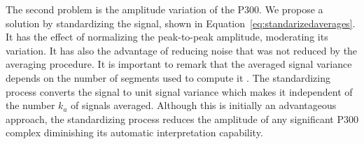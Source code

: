 The second problem is the amplitude variation of the P300. We propose a solution by standardizing the signal, shown in Equation~\ref{eq:standarizedaverages}. It has the effect of normalizing the peak-to-peak amplitude, moderating its variation. It has also the advantage of reducing noise that was not reduced by the averaging procedure.   It is important to remark that the averaged signal variance depends on the number of segments used to compute it \cite{van2006signal}.  The standardizing process converts the signal to unit signal variance which makes it independent of the number $k_a$ of signals averaged.   Although this is initially an advantageous approach, the standardizing process reduces the amplitude of any significant P300 complex diminishing its automatic interpretation capability.



